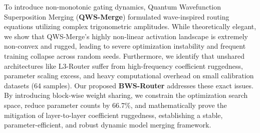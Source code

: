 To introduce non-monotonic gating dynamics, Quantum Wavefunction Superposition Merging (\textbf{QWS-Merge}) \cite{qws_merge_orig} formulated wave-inspired routing equations utilizing complex trigonometric amplitudes. While theoretically elegant, we show that QWS-Merge's highly non-linear activation landscape is extremely non-convex and rugged, leading to severe optimization instability and frequent training collapse across random seeds. Furthermore, we identify that unshared architectures like L3-Router suffer from high-frequency coefficient ruggedness, parameter scaling excess, and heavy computational overhead on small calibration datasets (64 samples). Our proposed \textbf{BWS-Router} addresses these exact issues. By introducing block-wise weight sharing, we constrain the optimization search space, reduce parameter counts by 66.7\%, and mathematically prove the mitigation of layer-to-layer coefficient ruggedness, establishing a stable, parameter-efficient, and robust dynamic model merging framework.
